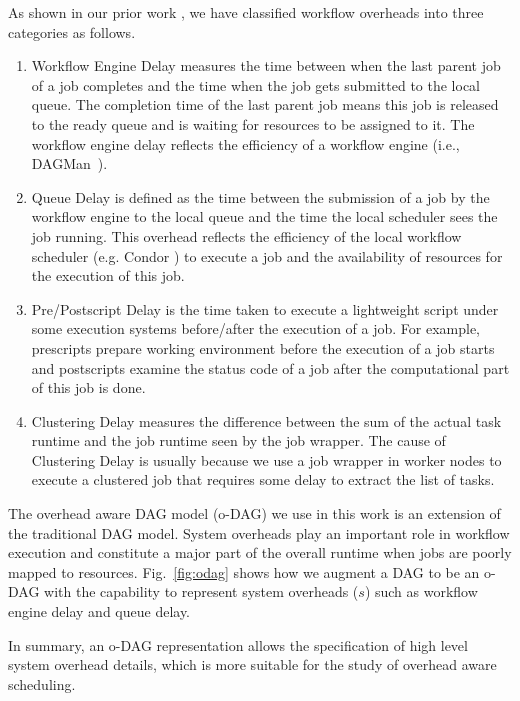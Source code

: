 As shown in our prior work \cite{Chen}, we have classified workflow overheads into three categories as follows. 
\begin{enumerate}

\item{Workflow Engine Delay} measures the time between when the last parent job of a job completes and the time when the job gets submitted to the local queue. The completion time of the last parent job means this job is released to the ready queue and is waiting for resources to be assigned to it. The workflow engine delay reflects the efficiency of a workflow engine (i.e., DAGMan~\cite{DAGMan}). 

\item{Queue Delay} is defined as the time between the submission of a job by the workflow engine to the local queue and the time the local scheduler sees the job running. This overhead reflects the efficiency of the local workflow scheduler (e.g. Condor \cite{Frey2002}) to execute a job and the availability of resources for the execution of this job. 

\item{Pre/Postscript Delay } is the time taken to execute a lightweight script under some execution systems before/after the execution of a job. For example, prescripts prepare working environment before the execution of a job starts and postscripts examine the status code of a job after the computational part of this job is done.

\item{Clustering Delay} measures the difference between the sum of the actual task runtime and the job runtime seen by the job wrapper. The cause of Clustering Delay is usually because we use a job wrapper in worker nodes to execute a clustered job that requires some delay to extract the list of tasks. 

\end{enumerate}

The overhead aware DAG model (o-DAG) we use in this work is an extension of the traditional DAG model. System overheads play an important role in workflow execution and constitute a major part of the overall runtime when jobs are poorly mapped to resources. Fig.~\ref{fig:odag} shows how we augment a DAG to be an o-DAG with the capability to represent system overheads ($s$) such as workflow engine delay and queue delay.  


In summary, an o-DAG representation allows the specification of high level system overhead details, which is more suitable for the study of overhead aware scheduling. 

